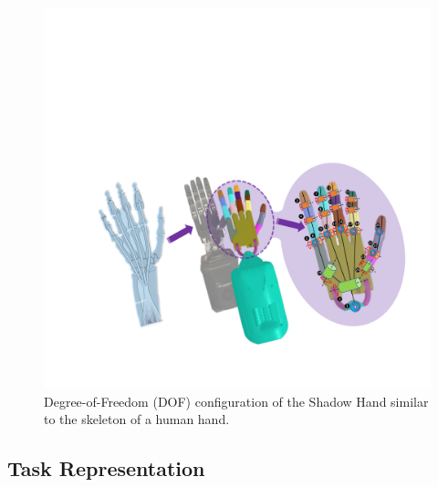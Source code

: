 \documentclass{article}
\begin{document}
\begin{figure}[h]
  \centering
  \includegraphics[width=\linewidth]{assets/appendix/appendix-dexteroud-hand.pdf}
  \caption{Degree-of-Freedom (DOF) configuration of the Shadow Hand similar to the skeleton of a human hand.}
  \label{pic:shadowhand-dyn}
\end{figure}

\subsection{Task Representation}
\end{document}
